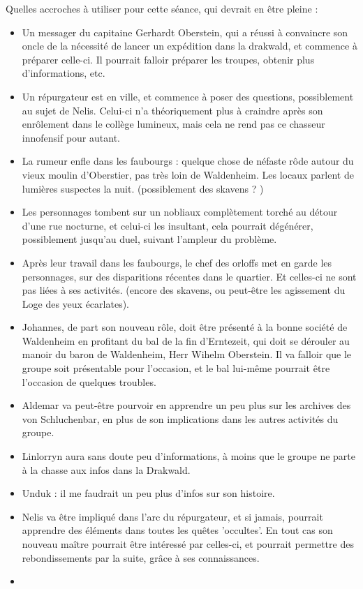 \documentclass[10pt,a4paper]{book}
\newcommand{\nomadversaire}{Loge des yeux écarlates}
\begin{document}
Quelles accroches à utiliser pour cette séance, qui devrait en être pleine : 
\begin{itemize}
\item Un messager du capitaine Gerhardt Oberstein, qui a réussi à convaincre son oncle de la nécessité de lancer un expédition dans la drakwald, et commence à préparer celle-ci. Il pourrait falloir préparer les troupes, obtenir plus d'informations, etc.
\item Un répurgateur est en ville, et commence à poser des questions, possiblement au sujet de Nelis. Celui-ci n'a théoriquement plus à craindre après son enrôlement dans le collège lumineux, mais cela ne rend pas ce chasseur innofensif pour autant.
\item La rumeur enfle dans les faubourgs : quelque chose de néfaste rôde autour du vieux moulin d'Oberstier, pas très loin de Waldenheim. Les locaux parlent de lumières suspectes la nuit. (possiblement des skavens ? )
\item Les personnages tombent sur un nobliaux complètement torché au détour d'une rue nocturne, et celui-ci les insultant, cela pourrait dégénérer, possiblement jusqu'au duel, suivant l'ampleur du problème.
\item Après leur travail dans les faubourgs, le chef des orloffs met en garde les personnages, sur des disparitions récentes dans le quartier. Et celles-ci ne sont pas liées à ses activités. (encore des skavens, ou peut-être les agissement du \nomadversaire ).
\item Johannes, de part son nouveau rôle, doit être présenté à la bonne société de Waldenheim en profitant du bal de la fin d'Erntezeit, qui doit se dérouler au manoir du baron de Waldenheim, Herr Wihelm Oberstein. Il va falloir que le groupe soit présentable pour l'occasion, et le bal lui-même pourrait être l'occasion de quelques troubles.
\item Aldemar va peut-être pourvoir en apprendre un peu plus sur les archives des von  Schluchenbar, en plus de son implications dans les autres activités du groupe.
\item Linlorryn aura sans doute peu d'informations, à moins que le groupe ne parte à la chasse aux infos dans la Drakwald.
\item Unduk : il me faudrait un peu plus d'infos sur son histoire.
\item Nelis va être impliqué dans l'arc du répurgateur, et si jamais, pourrait apprendre des éléments dans toutes les quêtes 'occultes'. En tout cas son nouveau maître pourrait être intéressé par celles-ci, et pourrait permettre des rebondissements par la suite, grâce à ses connaissances.
\item 
\end{itemize}
\end{document}
